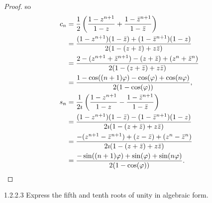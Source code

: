 \begin{proof}
	so
	\begingroup
	\allowdisplaybreaks%
	\begin{align*}
		c_{n} & = \dfrac{1}{2}\left( \dfrac{1 - z^{n+1}}{1 - z} + \dfrac{1 - \bar{z}^{n+1}}{1 - \bar{z}} \right)                    \\
		      & = \dfrac{(1 - z^{n+1})(1 - \bar{z}) + (1 - \bar{z}^{n+1})(1 - z)}{2(1 - (z + \bar{z}) + z\bar{z})}                  \\
		      & = \dfrac{2 - (z^{n+1} + \bar{z}^{n+1}) - (z + \bar{z}) + (z^{n} + \bar{z}^{n})}{2(1 - (z + \bar{z}) + z\bar{z})}    \\
		      & = \dfrac{1 - \cos((n + 1)\varphi) - \cos(\varphi) + \cos(n\varphi)}{2(1 - \cos(\varphi))},                          \\
		s_{n} & = \dfrac{1}{2\imath}\left( \dfrac{1 - z^{n+1}}{1 - z} - \dfrac{1 - \bar{z}^{n+1}}{1 - \bar{z}} \right)              \\
		      & = \dfrac{(1 - z^{n+1})(1 - \bar{z}) - (1 - \bar{z}^{n+1})(1 - z)}{2\imath(1 - (z + \bar{z}) + z\bar{z})}            \\
		      & = \dfrac{-(z^{n+1} - \bar{z}^{n+1}) + (z - \bar{z}) + (z^{n} - \bar{z}^{n})}{2\imath(1 - (z + \bar{z}) + z\bar{z})} \\
		      & = \dfrac{-\sin((n+1)\varphi) + \sin(\varphi) + \sin(n\varphi)}{2(1 - \cos(\varphi))}. \qedhere
	\end{align*}
	\endgroup
\end{proof}

\begin{problem}{1.2.2.3}
Express the fifth and tenth roots of unity in algebraic form.
\end{problem}


